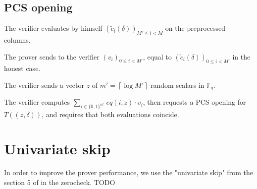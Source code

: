 \documentclass{article}
\newcommand{\Fq}{\mathbb F_q}
\newcommand{\Pol}{T}
\begin{document}
\subsection{PCS opening}

The verifier evaluates by himself $(\tilde{c}_i(\delta))_{M' \leq i < M}$ on the preprocessed columns.

The prover sends to the verifier $(v_i)_{0 \leq i < M'}$, equal to $(\tilde{c}_i(\delta))_{0 \leq i < M'}$ in the honest case.

The verifier sends a vector $z$ of $m' = \left\lceil  \log M' \right\rceil$ random scalars in $\Fq$.

The verifier computes $\sum_{i \in \{0, 1\}^{m'}} eq(i, z) \cdot v_i$, then requests a PCS opening for $\Pol((z, \delta))$, and requires that both evaluations coincide.

\section{Univariate skip}

In order to improve the prover performance, we use the "univariate skip" from the section 5 of \cite{univariate_skip} in the zerocheck. TODO 





\end{document}
